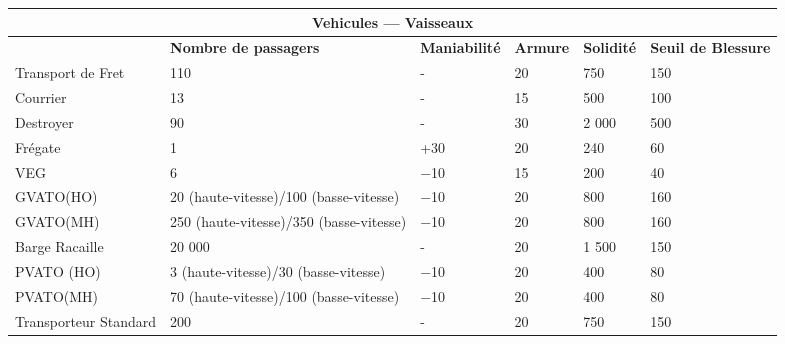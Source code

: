 \begin{table} \begin{tabularx}{\textwidth}{|l|X|l|X|l|l|} \hline

\multicolumn{6}{|c|}{\textbf{Vehicules --- Vaisseaux}} \\ \hline

&\textbf{Nombre de passagers}	&\textbf{Maniabilité}	&\textbf{Armure}	&\textbf{Solidité}	&\textbf{Seuil de Blessure}\\ \hline

Transport de Fret	&110	&- &20	&750	&150 \\ \hline

Courrier	&13	&- &15	&500	&100 \\ \hline

Destroyer	&90	&- &30	&2 000	&500 \\ \hline

Frégate	&1	&+30	&20	&240	&60 \\ \hline

VEG	&6	&$-$10	&15	&200	&40 \\ \hline

GVATO(HO)	&20 (haute-vitesse)/100 (basse-vitesse)	&$-$10	&20	&800	&160 \\ \hline

GVATO(MH)	&250 (haute-vitesse)/350 (basse-vitesse)	&$-$10	&20	&800	&160 \\ \hline

Barge Racaille	&20 000	&- &20	&1 500	&150 \\ \hline

PVATO (HO)	&3 (haute-vitesse)/30 (basse-vitesse)	&$-$10	&20	&400	&80 \\ \hline

PVATO(MH)	&70 (haute-vitesse)/100 (basse-vitesse)	&$-$10	&20	&400	&80 \\ \hline

Transporteur Standard	&200	&- &20	&750	&150 \\ \hline

\end{tabularx} \label{tab:spacecraft} \end{table} 
